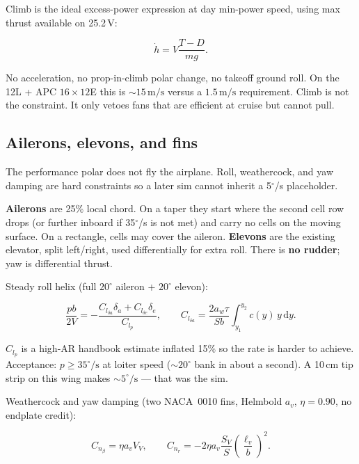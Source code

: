 \documentclass[11pt,letterpaper]{article}
\begin{document}
Climb is the ideal excess-power expression at day min-power speed, using max thrust available on 25.2\,V:

\begin{equation}
  \dot{h} = V \frac{T - D}{mg}.
\end{equation}

No acceleration, no prop-in-climb polar change, no takeoff ground roll. On the 12L + APC $16\times12$E this is $\sim 15\,\mathrm{m/s}$ versus a $1.5\,\mathrm{m/s}$ requirement. Climb is not the constraint. It only vetoes fans that are efficient at cruise but cannot pull.

\subsection{Ailerons, elevons, and fins}
\label{sec:control}

The performance polar does not fly the airplane. Roll, weathercock, and yaw damping are hard constraints so a later sim cannot inherit a 5$^\circ$/s placeholder.

\textbf{Ailerons} are 25\% local chord. On a taper they start where the second cell row drops (or further inboard if 35$^\circ$/s is not met) and carry no cells on the moving surface. On a rectangle, cells may cover the aileron. \textbf{Elevons} are the existing elevator, split left/right, used differentially for extra roll. There is \textbf{no rudder}; yaw is differential thrust.

Steady roll helix (full $20^\circ$ aileron + $20^\circ$ elevon):

\begin{equation}
  \frac{p b}{2V} = -\frac{C_{l_{\delta a}}\delta_a + C_{l_{\delta e}}\delta_e}{C_{l_p}},
  \qquad
  C_{l_{\delta a}} = \frac{2 a_w \tau}{S b}\int_{y_1}^{y_2} c(y)\, y\,\mathrm{d}y.
\end{equation}

$C_{l_p}$ is a high-AR handbook estimate inflated 15\% so the rate is harder to achieve. Acceptance: $p \ge 35^\circ/\mathrm{s}$ at loiter speed ($\sim 20^\circ$ bank in about a second). A 10\,cm tip strip on this wing makes $\sim 5^\circ/\mathrm{s}$ --- that was the sim.

Weathercock and yaw damping (two NACA~0010 fins, Helmbold $a_v$, $\eta=0.90$, no endplate credit):

\begin{equation}
  C_{n_\beta} = \eta a_v V_V, \qquad
  C_{n_r} = -2\eta a_v \frac{S_V}{S}\left(\frac{\ell_v}{b}\right)^2.
\end{equation}
\end{document}
